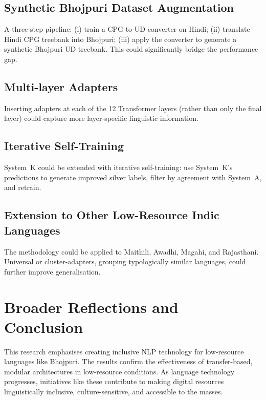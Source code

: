 \documentclass[12pt,a4paper,oneside]{report}
\begin{document}
\subsection{Synthetic Bhojpuri Dataset Augmentation}

A three-step pipeline: (i) train a CPG-to-UD converter on Hindi; (ii) translate
Hindi CPG treebank into Bhojpuri; (iii) apply the converter to generate a synthetic
Bhojpuri UD treebank. This could significantly bridge the performance gap.

\subsection{Multi-layer Adapters}

Inserting adapters at each of the 12 Transformer layers (rather than only the final
layer) could capture more layer-specific linguistic information.

\subsection{Iterative Self-Training}

System~K could be extended with iterative self-training: use System~K's predictions
to generate improved silver labels, filter by agreement with System~A, and retrain.

\subsection{Extension to Other Low-Resource Indic Languages}

The methodology could be applied to Maithili, Awadhi, Magahi, and Rajasthani.
Universal or cluster-adapters, grouping typologically similar languages, could
further improve generalisation.

\section{Broader Reflections and Conclusion}

This research emphasises creating inclusive NLP technology for low-resource languages
like Bhojpuri. The results confirm the effectiveness of transfer-based, modular
architectures in low-resource conditions. As language technology progresses,
initiatives like these contribute to making digital resources linguistically
inclusive, culture-sensitive, and accessible to the masses.


\appendix
\end{document}
